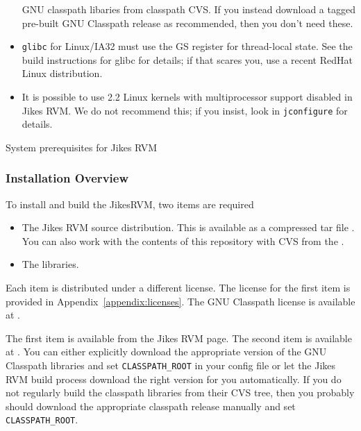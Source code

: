 \begin{table}[h]
\begin{center}
\begin{itemize}
GNU classpath libaries from classpath CVS. If you instead download a
tagged pre-built GNU Classpath release as recommended, then you don't need
these.
\item {\tt glibc} for Linux/IA32 must use the GS register for
thread-local state.  See the build instructions for glibc for details;
if that scares you, use a recent RedHat Linux distribution.
\item It is possible to use 2.2 Linux kernels with multiprocessor
support disabled in Jikes RVM.  We do not recommend this; if you
insist, look in {\tt jconfigure} for details.
\end{itemize}
\end{center}
\caption{System prerequisites for Jikes RVM}
\label{prereqs}
\end{table}

\AIXPPCJikesTMFooter

\JavaTMFooter

\subsubsection{Installation Overview}

To install and build the Jikes\trademark RVM, two items are required
\begin{itemize}
\item The Jikes RVM source distribution.  This is available as a
compressed tar file {\tt \RVMTarFile}.  You can also work with the
contents of this repository with CVS from the 
.

\item The 
 libraries. 
\end{itemize}

Each item is distributed under a different license.  The license for
the first item is provided in Appendix~\ref{appendix:licenses}.  The
GNU Classpath license is available at \xlink{{\tt
\classpathURL}}{\classpathURL}. 

The first item is available  from the Jikes RVM
 page. The second item is available at
\xlink{{\tt \classpathURL}}{\classpathURL}.
You can either explicitly download the appropriate version of the GNU
Classpath libraries and set {\tt CLASSPATH\_ROOT} in your config file or let
the Jikes RVM build process download the right version for you
automatically. If you do not regularly build the classpath libraries
from their CVS tree, then you probably should download the appropriate
classpath release manually and set {\tt CLASSPATH\_ROOT}. 

